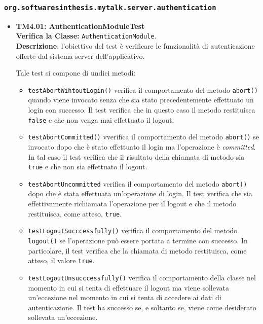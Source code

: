 \subsubsection{\texttt{org.softwaresinthesis.mytalk.server.authentication}}
\begin{itemize}

\item \textbf{TM4.01: AuthenticationModuleTest}\\
\textbf{Verifica la Classe:} \texttt{AuthenticationModule}.\\
\textbf{Descrizione}: l'obiettivo del test è verificare le funzionalità di autenticazione offerte dal sistema server dell'applicativo.

Tale test si compone di undici metodi:
\begin{itemize}
\item \texttt{testAbortWihtoutLogin()} verifica il comportamento del metodo \texttt{abort()} quando viene invocato senza che sia stato precedentemente effettuato un login con successo. Il test verifica che in questo caso il metodo restituisca \texttt{false} e che non venga mai effettuato il logout.

\item \texttt{testAbortCommitted()} vverifica il comportamento del metodo \texttt{abort()} se invocato dopo che è stato effettuato il login ma l'operazione è \textit{committed}. In tal caso il test verifica che il risultato della chiamata di metodo sia \texttt{true} e che non sia effettuato il logout.

\item \texttt{testAbortUncommitted} verifica il comportamento del metodo \texttt{abort()} dopo che è stata effettuata un'operazione di login. Il test verifica che sia effettivamente richiamata l'operazione per il logout e che il metodo restituisca, come atteso, \texttt{true}.

\item \texttt{testLogoutSucccessfully()} verifica il comportamento del metodo \texttt{logout()} se l'operazione può essere portata a termine con successo. In particolare, il test verifica che la chiamata di metodo restituisca, come atteso, il valore \texttt{true}.

\item \texttt{testLogoutUnsucccessfully()} verifica il comportamento della classe nel momento in cui si tenta di effettuare il logout ma viene sollevata un'eccezione nel momento in cui si tenta di accedere ai dati di autenticazione. Il test ha successo se, e soltanto se, viene come desiderato sollevata un'eccezione.


\end{itemize}
\end{itemize}
